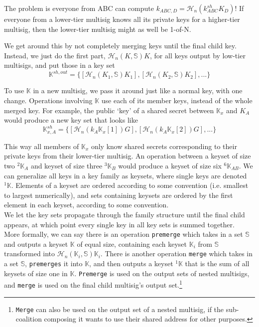 The problem is everyone from ABC can compute $k_{ABC,D} = \mathcal{H}_n(k^{sh}_{ABC} K_D)$! If everyone from a lower-tier multisig knows all its private keys for a higher-tier multisig, then the lower-tier multisig might as well be 1-of-N.

We get around this by not completely merging keys until the final child key. Instead, we just do the first part, $\mathcal{H}_n(K,\mathbb{S}) K$, for all keys output by low-tier multisigs, and put those in a key set
\[ \mathbb{K}^{sh,out} = \{ [\mathcal{H}_n(K_1,\mathbb{S}) K_1], [\mathcal{H}_n(K_2,\mathbb{S}) K_2], ... \} \]

To use $\mathbb{K}$ in a new multisig, we pass it around just like a normal key, with one change. Operations involving $\mathbb{K}$ use each of its member keys, instead of the whole merged key. For example, the public `key' of a shared secret between $\mathbb{K}_x$ and $K_A$ would produce a new key set that looks like
\[ \mathbb{K}^{sh}_{x,A} = \{ [\mathcal{H}_n(k_A \mathbb{K}_x[1]) G], [\mathcal{H}_n(k_A \mathbb{K}_x[2]) G], ...\}\]

This way all members of $\mathbb{K}_x$ only know shared secrets corresponding to their private keys from their lower-tier multisig. An operation between a keyset of size two ${}^{2}\mathbb{K}_A$ and keyset of size three ${}^{3}\mathbb{K}_B$ would produce a keyset of size six ${}^{6}\mathbb{K}_{AB}$. We can generalize all keys in a key family as keysets, where single keys are denoted ${}^{1}\mathbb{K}$. Elements of a keyset are ordered according to some convention (i.e. smallest to largest numerically), and sets containing keysets are ordered by the first element in each keyset, according to some convention.\\

We let the key sets propagate through the family structure until the final child appears, at which point every single key in all key sets is summed together.\\

More formally, we can say there is an operation {\tt premerge} which takes in a set $\mathbb{S}$ and outputs a keyset $\mathbb{K}$ of equal size, containing each keyset $\mathbb{K}_i$ from $\mathbb{S}$ transformed into $\mathcal{H}_n(\mathbb{K}_i,\mathbb{S}) \mathbb{K}_i$. There is another operation {\tt merge} which takes in a set $\mathbb{S}$, {\tt premerges} it into $\mathbb{K}$, and then outputs a keyset ${}^{1}\mathbb{K}$ that is the sum of all keysets of size one in $\mathbb{K}$. {\tt Premerge} is used on the output sets of nested multisigs, and {\tt merge} is used on the final child multisig's output set.\footnote{{\tt Merge} can also be used on the output set of a nested multisig, if the sub-coalition composing it wants to use their shared address for other purposes.}

